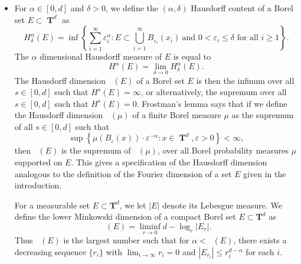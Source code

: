 \documentclass[dvipsnames,letterpaper,12pt]{article}
\numberwithin{equation}{section}
\DeclareMathOperator{\hausdim}{\dim_{\mathbf{H}}}
\DeclareMathOperator{\lowminkdim}{\underline{\dim}_{\mathbf{M}}}
\DeclareMathOperator{\TT}{\mathbf{T}}
\numberwithin{theorem}{section}
\begin{document}
\begin{itemize}
    \item For $\alpha \in [0,d]$ and $\delta > 0$, we define the $(\alpha,\delta)$ Hausdorff content of a Borel set $E \subset \TT^d$ as
    \[ H^\alpha_\delta(E) = \inf \left\{ \sum_{i = 1}^\infty \varepsilon_i^\alpha : E \subset \bigcup_{i = 1}^\infty B_{\varepsilon_i}(x_i)\ \text{and $0 < \varepsilon_i \leq \delta$ for all $i \geq 1$} \right\}. \]
    The $\alpha$ dimensional Hausdorff measure of $E$ is equal to
    \[ H^\alpha(E) = \lim_{\delta \to 0} H^\alpha_\delta(E). \]
    The Hausdorff dimension $\hausdim(E)$ of a Borel set $E$ is then the infinum over all $s \in [0,d]$ such that $H^s(E) = \infty$, or alternatively, the supremum over all $s \in [0,d]$ such that $H^s(E) = 0$. Frostman's lemma says that if we define the Hausdorff dimension $\hausdim(\mu)$ of a finite Borel measure $\mu$ as the supremum of all $s \in [0,d]$ such that
    \[ \sup \left\{ \mu(B_\varepsilon(x)) \cdot \varepsilon^{-\alpha} : x \in \TT^d, \varepsilon > 0 \right\} < \infty, \]
    then $\hausdim(E)$ is the supremum of $\hausdim(\mu)$, over all Borel probability measures $\mu$ supported on $E$. This gives a specification of the Hausdorff dimension analogous to the definition of the Fourier dimension of a set $E$ given in the introduction.


    For a measurable set $E \subset \mathbf{T}^d$, we let $|E|$ denote its Lebesgue measure. We define the lower Minkowski dimension of a compact Borel set $E \subset \mathbf{T}^d$ as
    \[ \lowminkdim(E) = \liminf_{r \to 0} d - \log_r|E_r|. \]
    Thus $\lowminkdim(E)$ is the largest number such that for $\alpha < \lowminkdim(E)$, there exists a decreasing sequence $\{ r_i \}$ with $\lim_{i \to \infty} r_i = 0$ and $|E_{r_i}| \leq r_i^{d - \alpha}$ for each $i$.


\end{itemize}
\end{document}
